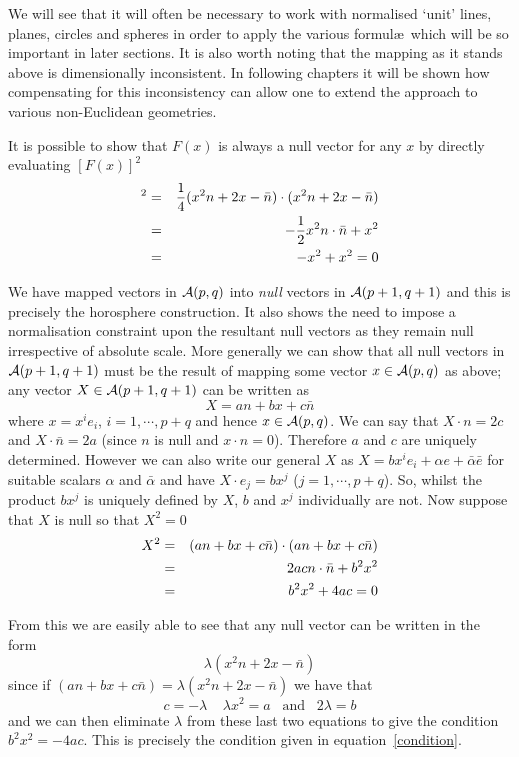 We will see that it will often be necessary to work with
normalised `unit' lines, planes, circles and spheres in order to
apply the various formul\ae\ which will be so
important in later sections. It is also worth noting that the
mapping as it stands above is dimensionally inconsistent. In following
chapters it will be shown how compensating for this inconsistency 
can allow one to extend the approach to various non-Euclidean geometries.

It is possible to show that $F(x)$ is always a null vector for
any $x$ by directly evaluating $[F(x)]^2$
%
\begin{eqnarray}
 [F(x)]^2 & = &  \frac{1}{4}(x^2n + 2x - \bar{n})\cdot (x^2n + 2x - \bar{n}) \nn \\
              & = & -\frac{1}{2}x^2 n\cdot \bar{n} + x^2  \nn \\
              & = &  -x^2 + x^2 = 0
\end{eqnarray}
%

We have mapped vectors in ${\mathcal{A}}(p,q)$ into \emph{null}
vectors in ${\mathcal{A}}(p+1,q+1)$ and this is precisely the horosphere 
construction. It also shows the need to impose a normalisation
constraint upon the resultant null vectors as they remain null 
irrespective of absolute scale.
More generally we can show that all null vectors in $\mathcal{A}(p+1,q+1)$
must be the result of mapping some vector $x \in \mathcal{A}(p,q)$ as above;
any vector $X \in {\mathcal{A}}(p+1,q+1)$ can be written as
%
\[ X = an + bx + c\bar{n}  \]
%
where $x = x^ie_i$, $i=1,\cdots,p+q$ and hence $x \in \mathcal{A}(p,q)$.
We can say that $X\cdot n = 2c$ and $X\cdot \bar{n}=2a$ (since $n$ is 
null and $x\cdot n = 0$). Therefore $a$
and $c$ are uniquely determined. However we can also write our
general $X$ as  $X=b{x}^ie_i + \alpha e + \bar{\alpha}\bar{e}$ for 
suitable scalars $\alpha$ and $\bar{\alpha}$ and
have $X\cdot e_j= bx^j$ ($j=1,\cdots,p+q$). So, whilst the product
$bx^j$ is uniquely defined by $X$, $b$ and $x^j$ individually are
not. Now suppose that $X$ is null so that $X^2=0$
%
\begin{eqnarray}
X^2 & = &   (an + bx + c\bar{n})\cdot (an + bx + c\bar{n}) \nonumber \\
       & = &  2ac n\cdot \bar{n} + b^2x^2 \nonumber \\
       & = & b^2x^2 + 4ac = 0
       \label{condition}
\end{eqnarray}
%

From this we are easily able to see that any null vector can be
written in the form
%
\begin{equation}
\lambda (x^2n + 2x - \bar{n}) \label{null}
\end{equation} 
%
since if $(an + bx + c\bar{n}) = \lambda(x^2n + 2x -
\bar{n})$ we have that
%
\[c=-\lambda\;\;\;\; \lambda x^2 = a \;\;\;\mbox{and}\;\;\; 2\lambda = b\]
%
and we can then eliminate $\lambda$ from these last two
equations to give the condition $b^2 x^2 = -4ac$. This
is precisely the condition given in
equation~\ref{condition}.

